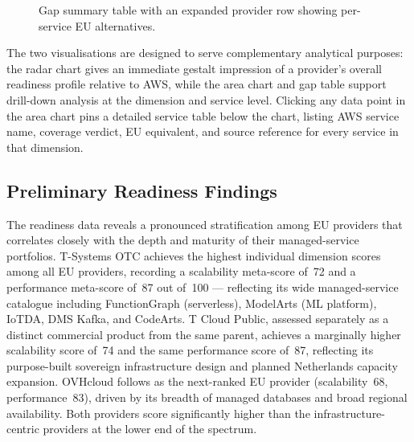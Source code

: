 \begin{figure}[htbp]
  \centering
  \caption{Gap summary table with an expanded provider row showing per-service EU alternatives.}
  \label{fig:readiness_gap_table}
\end{figure}

The two visualisations are designed to serve complementary analytical purposes: the radar chart gives an immediate gestalt impression of a provider's overall readiness profile relative to AWS, while the area chart and gap table support drill-down analysis at the dimension and service level. Clicking any data point in the area chart pins a detailed service table below the chart, listing AWS service name, coverage verdict, EU equivalent, and source reference for every service in that dimension.


\subsection{Preliminary Readiness Findings}
\label{subsec:readiness_preliminary}

The readiness data reveals a pronounced stratification among EU providers that correlates closely with the depth and maturity of their managed-service portfolios. T-Systems OTC achieves the highest individual dimension scores among all EU providers, recording a scalability meta-score of~72 and a performance meta-score of~87 out of~100 — reflecting its wide managed-service catalogue including FunctionGraph (serverless), ModelArts (ML platform), IoTDA, DMS Kafka, and CodeArts. T Cloud Public, assessed separately as a distinct commercial product from the same parent, achieves a marginally higher scalability score of~74 and the same performance score of~87, reflecting its purpose-built sovereign infrastructure design and planned Netherlands capacity expansion. OVHcloud follows as the next-ranked EU provider (scalability~68, performance~83), driven by its breadth of managed databases and broad regional availability. Both providers score significantly higher than the infrastructure-centric providers at the lower end of the spectrum.

